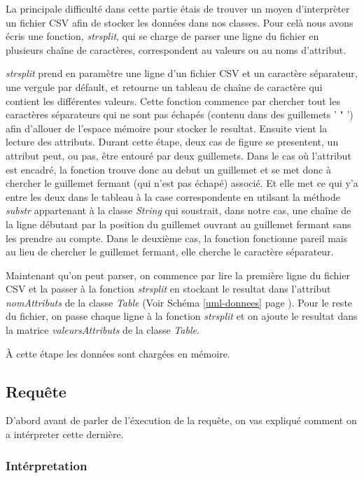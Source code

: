 \documentclass[oneside,13pt,a4paper]{report}
\begin{document}
La principale difficulté dans cette partie étais de trouver un moyen d'interprèter un fichier CSV afin de stocker les données dans nos classes.
Pour celà nous avons écris une fonction, \textit{strsplit}, qui se charge de parser une ligne du fichier en plusieurs chaîne de caractères, correspondent au valeurs ou au noms d'attribut.

\textit{strsplit} prend en paramètre une ligne d'un fichier CSV et un caractère séparateur, une vergule par défault, et retourne un tableau de chaîne de caractère qui contient les différentes valeurs. Cette fonction commence par chercher tout les caractères séparateurs qui ne sont pas échapés (contenu dans des guillemets ' " ') afin d'allouer de l'espace mémoire pour stocker le resultat.
Ensuite vient la lecture des attributs. Durant cette étape, deux cas de figure se presentent, un attribut peut, ou pas, être entouré par deux guillemets. Dans le cas où l'attribut est encadré, la fonction trouve donc au debut un guillemet et se met donc à chercher le guillemet fermant (qui n'est pas échapé) associé. Et elle met ce qui y'a entre les deux dans le tableau à la case correspondente en utilsant la méthode \textit{substr} appartenant à la classe \textit{String} qui soustrait, dans notre cas, une chaîne de la ligne débutant par la position du guillemet ouvrant au guillemet fermant sans les prendre au compte.
Dans le deuxième cas, la fonction fonctionne pareil mais au lieu de chercher le guillemet fermant, elle cherche le caractère séparateur.

Maintenant qu'on peut parser, on commence par lire la première ligne du fichier CSV et la passer à la fonction \textit{strsplit} en stockant le resultat dans l'attribut \textit{nomAttributs} de la classe \textit{Table} (Voir Schéma \ref{uml-donnees} page \pageref{uml-donnees}). Pour le reste du fichier, on passe chaque ligne à la fonction \textit{strsplit} et on ajoute le resultat dans la matrice \textit{valeursAttributs} de la classe \textit{Table}.

À cette étape les données sont chargées en mémoire.

\subsection{Requête}

D'abord avant de parler de l'éxecution de la requête, on vas expliqué comment on a intérpreter cette dernière.

\subsubsection{Intérpretation}
\end{document}
